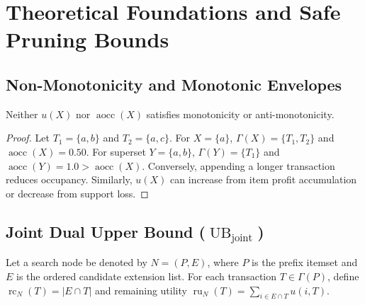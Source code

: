 \documentclass[runningheads]{llncs}
\newcommand{\aocc}{\operatorname{aocc}}
\newcommand{\UBjoint}{\operatorname{UB}_{\mathrm{joint}}}
\begin{document}
\section{Theoretical Foundations and Safe Pruning Bounds}
\label{sec:theory}

\subsection{Non-Monotonicity and Monotonic Envelopes}

\begin{theorem}
Neither $u(X)$ nor $\aocc(X)$ satisfies monotonicity or anti-monotonicity.
\end{theorem}
\begin{proof}
Let $T_1 = \{a, b\}$ and $T_2 = \{a, c\}$. For $X = \{a\}$, $\Gamma(X) = \{T_1, T_2\}$ and $\aocc(X) = 0.50$. For superset $Y = \{a, b\}$, $\Gamma(Y) = \{T_1\}$ and $\aocc(Y) = 1.0 > \aocc(X)$. Conversely, appending a longer transaction reduces occupancy. Similarly, $u(X)$ can increase from item profit accumulation or decrease from support loss.
\end{proof}

\subsection{Joint Dual Upper Bound ($\UBjoint$)}

Let a search node be denoted by $N = (P, E)$, where $P$ is the prefix itemset and $E$ is the ordered candidate extension list. For each transaction $T \in \Gamma(P)$, define $\operatorname{rc}_N(T) = |E \cap T|$ and remaining utility $\operatorname{ru}_N(T) = \sum_{i \in E \cap T} u(i, T)$.
\end{document}
